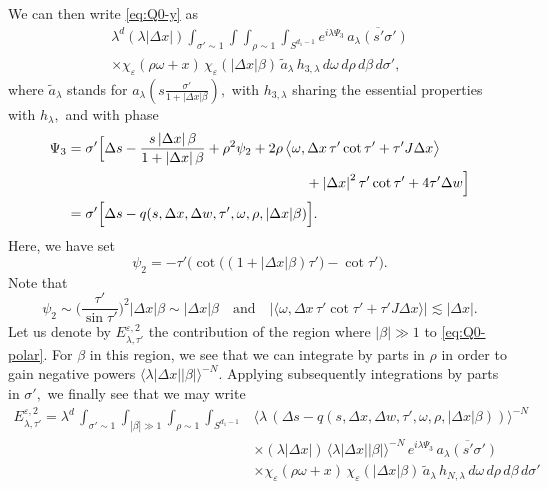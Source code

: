 \documentclass[leqno]{amsart}
\theoremstyle{definition}
\theoremstyle{remark}
\numberwithin{equation}{section}
\newcommand{\jp}[1]{\langle{#1}\rangle}
\newcommand\la{{\lambda}}
\newcommand\ve{{\varepsilon}}
\begin{document}
We can then write \eqref{eq:Q0-y} as 
\begin{multline}\label{eq:Q0-polar}
\lambda^d (\la |\Delta x|) \int_{\sigma' \sim 1} \int  \int_{\rho \sim 1}  \int_{S^{d_1-1}} e^{i\lambda \Psi_3}  
 \, \overline{a_\lambda(s'\sigma')}  \\ \times \chi_{\varepsilon}(\rho\omega + x) \, \chi_\ve(\left|\Delta x\right|\beta)\,\tilde a_\la\, h_{3,\lambda}\,d\omega \, d\rho  \, d\beta \, d\sigma' ,
\end{multline}
where $\tilde a_\la$ stands for $a_\lambda(s\frac{\sigma'}{1 + |\Delta x|  \beta}),$
with $h_{3,\lambda}$ sharing the essential  properties with $h_\la,$
and with phase 
\begin{align*}
\Psi_ 3 &=  \sigma'\Big[\Delta s - \frac{s\left|\Delta x\right| \beta }{1 + \left|\Delta x\right|\beta} +\rho^2 \psi_2+2\rho \, \big\langle \omega, \Delta x \,\tau' \cot \tau' +\tau' J\Delta x\big\rangle\\
 & \hskip6cm + \left|\Delta x\right|^2 \tau' \cot \tau' + 4 \tau' \Delta w\Big]\\
 &= \sigma'\Big[\Delta s-q(s,\Delta x,\Delta w,\tau',\omega,\rho,|\Delta x|\beta)\Big].
\end{align*}
Here, we have set
\[
\psi_2  = - \tau' \big(\cot\big((1 + \left|\Delta x\right|\beta) \tau' \big)-\cot \tau' \big).
\]
Note that
\[
\psi_2 \sim \Big(\frac{ \tau' }{\sin \tau' }\Big)^2 \left|\Delta x\right|\beta \sim \left|\Delta x\right|\beta\quad\text{and}\quad
|\big\langle \omega, \Delta x \, \tau' \cot \tau' +\tau' J\Delta x\big\rangle|\lesssim |\Delta x|.
\]
Let us denote by $E^{\varepsilon,2}_{\lambda,\tau'}$ the contribution of the region where $|\beta|\gg 1$ to \eqref{eq:Q0-polar}. For $\beta$ in this region, we see that we can integrate by parts in  $\rho$ in order to gain negative powers  $\jp{\lambda|\Delta x||\beta|}^{-N}.$ Applying subsequently integrations by parts in $\sigma',$ we finally see that we may write 
\begin{align*}
E^{\varepsilon,2}_{\lambda,\tau'}
= \la^d \,\int_{\sigma' \sim 1} \int_{|\beta|\gg 1}  \int_{\rho \sim 1}  \int_{S^{d_1-1}} 
& \big\langle \lambda\, (\Delta s - q(s,\Delta x,\Delta w,\tau',\omega,\rho,|\Delta x|\beta) ) \big\rangle^{-N} \\
& \times  (\la |\Delta x|)\, \jp{\lambda|\Delta x||\beta|}^{-N}\,
e^{i\lambda \Psi_3}  \,\overline{a_\lambda(s'\sigma')}  \\
& \times \chi_{\varepsilon}(\rho\omega + x) \,  \chi_\ve(\left|\Delta x\right|\beta)\, \tilde a_\la \,h_{N,\lambda}\,d\omega \, d\rho  \, d\beta \, d\sigma' 
\end{align*}
\end{document}
